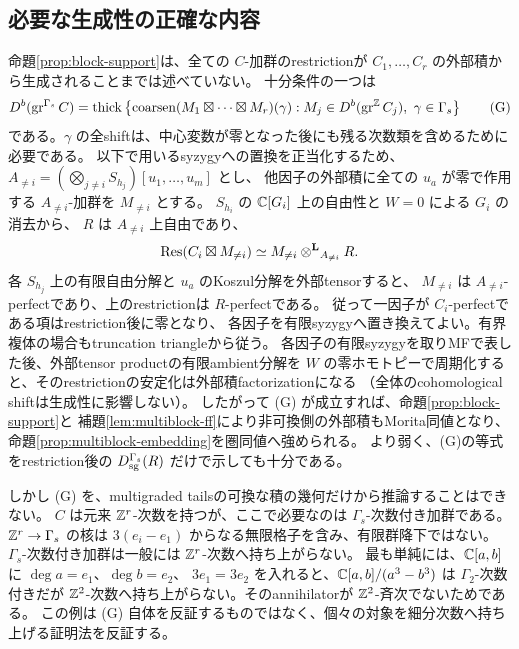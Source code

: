 \subsection{必要な生成性の正確な内容}

命題\ref{prop:block-support}は、全ての \(C\)-加群のrestrictionが
\(C_1,\ldots,C_r\) の外部積から生成されることまでは述べていない。
十分条件の一つは
\[
 D^b(\operatorname{gr}^{\Gamma_s}C)
 =\operatorname{thick}\left\{
 \operatorname{coarsen}(M_1\boxtimes\cdots\boxtimes M_r)(\gamma)
 :M_j\in D^b(\operatorname{gr}^{\mathbb Z}C_j),\ \gamma\in\Gamma_s
 \right\}
 \tag{G}\label{eq:block-generation}
\]
である。\(\gamma\) の全shiftは、中心変数が零となった後にも残る次数類を含めるために必要である。
以下で用いるsyzygyへの置換を正当化するため、
\(A_{\ne i}=(\bigotimes_{j\ne i}S_{h_j})[u_1,\ldots,u_m]\) とし、
他因子の外部積に全ての \(u_a\) が零で作用する \(A_{\ne i}\)-加群を \(M_{\ne i}\) とする。
\(S_{h_i}\) の \(\mathbb C[G_i]\) 上の自由性と \(W=0\) による \(G_i\) の消去から、
\(R\) は \(A_{\ne i}\) 上自由であり、
\[
 \operatorname{Res}(C_i\boxtimes M_{\ne i})
 \simeq M_{\ne i}\mathbin{\otimes^{\mathbf L}}_{A_{\ne i}}R.
\]
各 \(S_{h_j}\) 上の有限自由分解と \(u_a\) のKoszul分解を外部tensorすると、
\(M_{\ne i}\) は \(A_{\ne i}\)-perfectであり、上のrestrictionは \(R\)-perfectである。
従って一因子が \(C_i\)-perfectである項はrestriction後に零となり、
各因子を有限syzygyへ置き換えてよい。有界複体の場合もtruncation triangleから従う。
各因子の有限syzygyを取りMFで表した後、外部tensor productの有限ambient分解を
\(W\) の零ホモトピーで周期化すると、そのrestrictionの安定化は外部積factorizationになる
（全体のcohomological shiftは生成性に影響しない）。
したがって (G) が成立すれば、命題\ref{prop:block-support}と
補題\ref{lem:multiblock-ff}により非可換側の外部積もMorita同値となり、
命題\ref{prop:multiblock-embedding}を圏同値へ強められる。
より弱く、(G)の等式をrestriction後の \(D_{\mathrm{sg}}^{\Gamma_s}(R)\) だけで示しても十分である。

しかし (G) を、multigraded tailsの可換な積の幾何だけから推論することはできない。
\(C\) は元来 \(\mathbb Z^r\)-次数を持つが、ここで必要なのは
\(\Gamma_s\)-次数付き加群である。\(\mathbb Z^r\to\Gamma_s\) の核は
\(3(e_i-e_1)\) からなる無限格子を含み、有限群降下ではない。
\(\Gamma_s\)-次数付き加群は一般には \(\mathbb Z^r\)-次数へ持ち上がらない。
最も単純には、\(\mathbb C[a,b]\) に \(\deg a=e_1\)、\(\deg b=e_2\)、
\(3e_1=3e_2\) を入れると、\(\mathbb C[a,b]/(a^3-b^3)\) は \(\Gamma_2\)-次数付きだが
\(\mathbb Z^2\)-次数へ持ち上がらない。そのannihilatorが \(\mathbb Z^2\)-斉次でないためである。
この例は (G) 自体を反証するものではなく、個々の対象を細分次数へ持ち上げる証明法を反証する。


